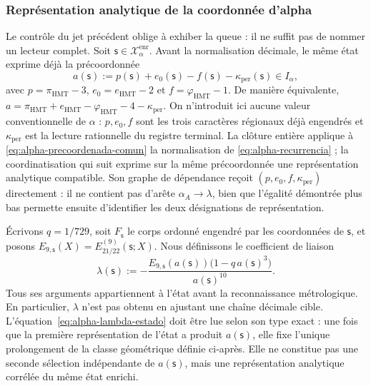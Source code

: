 \subsubsection{Représentation analytique de la coordonnée d'alpha}
\label{subsec:alpha-lector-completo-rev08}

Le contrôle du jet précédent oblige à exhiber la queue : il ne suffit pas de nommer un
lecteur complet. Soit \(\mathsf s\in\mathcal X_\alpha^{\mathrm{enr}}\). Avant
la normalisation décimale, le même état exprime déjà la précoordonnée
\begin{equation}
 a(\mathsf s):=p(\mathsf s)+e_0(\mathsf s)-f(\mathsf s)
                 -\kappa_{\mathrm{per}}(\mathsf s)\in I_\alpha,
 \label{eq:alpha-precoordenada-comun}
\end{equation}
avec \(p=\pi_{\mathrm{HMT}}-3\),
\(e_0=e_{\mathrm{HMT}}-2\) et
\(f=\varphi_{\mathrm{HMT}}-1\). De manière équivalente,
\(a=\pi_{\mathrm{HMT}}+e_{\mathrm{HMT}}-
\varphi_{\mathrm{HMT}}-4-\kappa_{\mathrm{per}}\). On n'introduit ici aucune valeur
conventionnelle de \(\alpha\) : \(p,e_0,f\) sont les trois caractères régionaux déjà
engendrés et \(\kappa_{\mathrm{per}}\) est la lecture rationnelle du registre
terminal. La clôture entière applique à
\eqref{eq:alpha-precoordenada-comun} la normalisation de
\eqref{eq:alpha-recurrencia} ; la coordinatisation qui suit exprime sur la même
précoordonnée une représentation analytique compatible. Son graphe de
dépendance reçoit \((p,e_0,f,\kappa_{\mathrm{per}})\) directement : il ne
contient pas d'arête \(\alpha_A\to\lambda\), bien que l'égalité démontrée plus
bas permette ensuite d'identifier les deux désignations de représentation.

Écrivons \(q=1/729\), soit \(F_{\mathsf s}\) le corps ordonné engendré par
les coordonnées de \(\mathsf s\), et posons
\(E_{9,\mathsf s}(X)=E_{21/22}^{(9)}(\mathsf s;X)\). Nous définissons le coefficient
de liaison
\begin{equation}
 \lambda(\mathsf s):=
 -\frac{E_{9,\mathsf s}(a(\mathsf s))
         \bigl(1-q\,a(\mathsf s)^3\bigr)}{a(\mathsf s)^{10}}.
 \label{eq:alpha-lambda-estado}
\end{equation}
Tous ses arguments appartiennent à l'état avant la reconnaissance
métrologique. En particulier, \(\lambda\) n'est pas obtenu en ajustant une chaîne
décimale cible. L'équation~\eqref{eq:alpha-lambda-estado} doit être lue selon
son type exact : une fois que la première représentation de l'état a produit
\(a(\mathsf s)\), elle fixe l'unique prolongement de la classe géométrique
définie ci-après. Elle ne constitue pas une seconde sélection indépendante de
\(a(\mathsf s)\), mais une représentation analytique corrélée du même
état enrichi.

